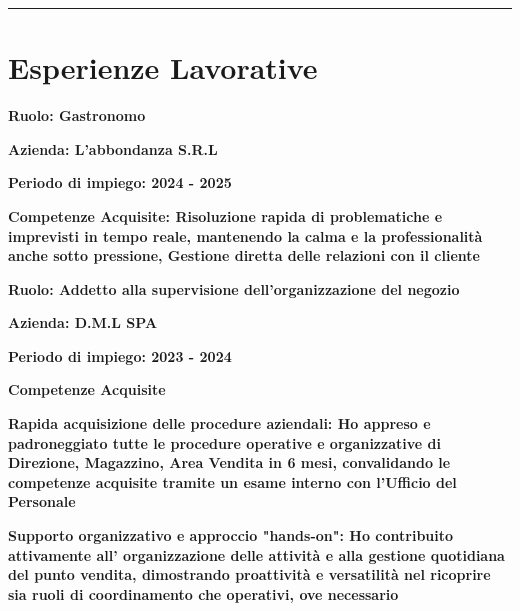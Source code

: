 \documentclass{article}
\newenvironment{listaIdentazione}[1]{
			\begin{list}{}{
			  \setlength{\leftmargin}{#1} %
			  \setlength{\itemsep}{0pt}	%
			  \setlength{\parskip}{0pt} %
			  \setlength{\parsep}{0pt} %
			  \setlength{\labelwidth}{0pt} %
			  \setlength{\labelsep}{0pt} %
			  \renewcommand{\makelabel}[1]{} %
			  }
			}{\end{list}}
\newcommand{\spaziocorto}{\\[0.1cm]}
\newcommand{\spaziolungo}{\\[0.3cm]}
\newcommand{\spaziopiulungo}{\\[0.8cm]}
\begin{document}
\hrule

\section*{\LARGE{Esperienze Lavorative}}
	\begin{flushleft}
	
		\textbf{\Large{Ruolo: Gastronomo }}
			\spaziocorto
			\begin{listaIdentazione}{0.5cm}
			\item {\textbf{\Large{Azienda: L'abbondanza S.R.L}}}
			\spaziocorto
			\item {\textbf{\Large{Periodo di impiego: 2024 - 2025}}}
			\spaziocorto
			\item {\textbf{\Large{Competenze Acquisite: Risoluzione rapida
			di problematiche e imprevisti in tempo reale, mantenendo la
			calma e la professionalità anche sotto pressione, Gestione diretta delle
			relazioni con il cliente}}}
			\spaziopiulungo
			\end{listaIdentazione}
			
		\textbf{\Large{Ruolo: Addetto alla supervisione dell'organizzazione del
		negozio }}
			\spaziocorto
			\begin{listaIdentazione}{0.5cm}
			\item {\textbf{\Large{Azienda: D.M.L SPA}}}
			\spaziocorto
			\item {\textbf{\Large{Periodo di impiego: 2023 - 2024}}}
			\spaziocorto
			\item {\textbf{\Large{Competenze Acquisite}}}
			\spaziolungo
			\item {\textbf{\Large{Rapida acquisizione delle procedure aziendali: Ho
			appreso e padroneggiato tutte le procedure operative e organizzative di
			Direzione, Magazzino, Area Vendita in 6 mesi, convalidando
			le competenze acquisite tramite un esame interno con l'Ufficio del Personale}}}
			\spaziolungo
			\item {\textbf{\Large{Supporto organizzativo e approccio "hands-on": Ho
			contribuito attivamente all' organizzazione delle attività e alla gestione
			quotidiana del punto vendita, dimostrando proattività e versatilità nel
			ricoprire sia ruoli di coordinamento che operativi, ove necessario }}}
			\spaziopiulungo
			\end{listaIdentazione}
			

\end{flushleft}
\end{document}
